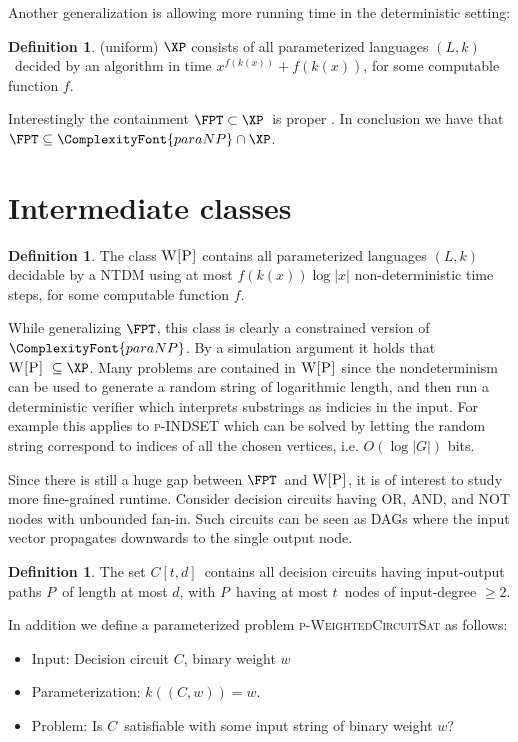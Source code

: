 \documentclass[a4paper,11pt]{report}
\theoremstyle{plain}
\theoremstyle{definition}
\newtheorem{defn}[thm]{Definition} %
\newcommand{\PARANP}{\ComplexityFont{paraNP}}
\begin{document}
Another generalization is allowing more running time in the deterministic setting:

\begin{defn}
(uniform) $\XP$ consists of all parameterized languages $(L, k)$ decided by an algorithm in time
$x^{f(k(x))} + f(k(x))$, for some computable function $f$.
\end{defn}


Interestingly the containment $\FPT \subset \XP$ is proper \cite{FG06}.
In conclusion we have that $\FPT \subseteq \PARANP \cap \XP$.

\section{Intermediate classes}

\begin{defn}
The class $\textsc{W[P]}$ contains all parameterized languages $(L, k)$ decidable by a NTDM using at most $f(k(x)) \log |x| $ non-deterministic time steps, for some computable function $f$.
\end{defn}

While generalizing $\FPT$, this class is clearly a constrained version of $\PARANP$.
By a simulation argument \cite{FG06} it holds that $\textsc{W[P]} \subseteq \XP$.
Many problems are contained in $\textsc{W[P]}$ since the nondeterminism can be used to generate a random string of logarithmic length, and then run a deterministic verifier which
interprets substrings as indicies in the input.
For example this applies to \textsc{p-INDSET} which can be solved by letting the random string correspond to indices of all the chosen vertices, i.e. $O(\log |G|)$ bits.

Since there is still a huge gap between $\FPT$ and $\textsc{W[P]}$, it is of interest to study more fine-grained runtime.
Consider decision circuits having OR, AND, and NOT nodes with unbounded fan-in.
Such circuits can be seen as DAGs where the input vector propagates downwards to the single output node.

\begin{defn}
The set $C[t, d]$ contains all decision circuits having input-output paths $P$ of length at most $d$, with $P$ having at most $t$ nodes of input-degree $\ge 2$.
\end{defn}

In addition we define a parameterized problem \textsc{p-WeightedCircuitSat} as follows:
\begin{itemize}
\item Input: Decision circuit $C$, binary weight $w$
\item Parameterization: $k((C, w)) = w$.
\item Problem: Is $C$ satisfiable with some input string of binary weight $w$?
\end{itemize}
\end{document}
